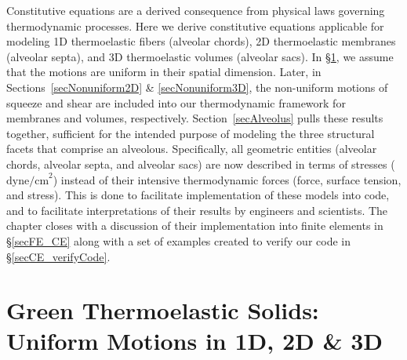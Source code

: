 Constitutive equations are a derived consequence from physical laws governing thermo\-dynamic processes.  Here we derive constitutive equations applicable for modeling 1D thermo\-elastic fibers (alveolar chords), 2D thermo\-elastic membranes (alveolar septa), and 3D thermo\-elastic volumes (alveolar sacs).  In \S\ref{secUniformCE}, we assume that the motions are uniform in their spatial dimension.  Later, in Sections~\ref{secNonuniform2D} \& \ref{secNonuniform3D}, the non-uniform motions of squeeze and shear are included into our thermo\-dynamic framework for membranes and volumes, respectively.  Section~\ref{secAlveolus} pulls these results together, sufficient for the intended purpose of modeling the three structural facets that comprise an alveolous.  Specifically, all geometric entities (alveolar chords, alveolar septa, and alveolar sacs) are now described in terms of stresses ($\text{dyne/cm}^2$) instead of their intensive thermo\-dynamic forces (force, surface tension, and stress).  This is done to facilitate implementation of these models into code, and to facilitate interpretations of their results by engineers and scientists.  The chapter closes with a discussion of their implementation into finite elements in \S\ref{secFE_CE} along with a set of examples created to verify our code in \S\ref{secCE_verifyCode}.

\section{Green Thermoelastic Solids: Uniform Motions in 1D, 2D \& 3D}
\label{secUniformCE}

